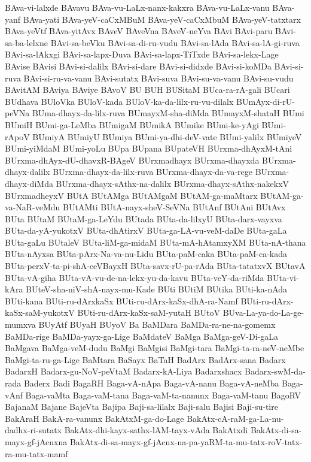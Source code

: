 {BAva-vi-lalxde
BAvavu
BAva-vu-LaLx-nanx-kakxra
BAva-vu-LaLx-vanu
BAva-yanf
BAva-yati
BAva-yeV-caCxMBuM
BAva-yeV-caCxMbuM
BAva-yeV-tatxtarx
BAva-yeVtf
BAva-yitAvx
BAveV
BAveVna
BAveV-neYva
BAvi
BAvi-paru
BAvi-sa-ba-lelxne
BAvi-sa-beVku
BAvi-sa-di-ru-vudu
BAvi-sa-lAda
BAvi-sa-lA-gi-ruva
BAvi-sa-lAkxgi
BAvi-sa-lapx-Duva
BAvi-sa-lapx-TiTxde
BAvi-sa-lekx-Lage
BAvise
BAvisi
BAvi-si-dalilx
BAvi-si-dare
BAvi-si-didxde
BAvi-si-koMDa
BAvi-si-ruva
BAvi-si-ru-va-vanu
BAvi-sutatx
BAvi-suva
BAvi-su-va-vanu
BAvi-su-vudu
BAvitAM
BAviya
BAviye
BAvoV
BU
BUH
BUSitaM
BUca-ra-rA-gali
BUcari
BUdhava
BUloVka
BUloV-kada
BUloV-ka-da-lilx-ru-vu-dilalx
BUmAyx-di-rU-peVNa
BUma-dhayx-da-lilx-ruva
BUmayxM-sha-diMda
BUmayxM-shataH
BUmi
BUmiH
BUmi-ga-LeMba
BUmigaM
BUmikA
BUmike
BUmi-ke-yAgi
BUmi-rApoV
BUmiyA
BUmiyU
BUmiya
BUmi-ya-dhi-deV-vate
BUmi-yalilx
BUmiyeV
BUmi-yiMdaM
BUmi-yoLu
BUpa
BUpana
BUpateVH
BUrxma-dhAyxM-tAni
BUrxma-dhAyx-dU-dhavxR-BAgeV
BUrxmadhayx
BUrxma-dhayxda
BUrxma-dhayx-dalilx
BUrxma-dhayx-da-lilx-ruva
BUrxma-dhayx-da-va-rege
BUrxma-dhayx-diMda
BUrxma-dhayx-sAthx-na-dalilx
BUrxma-dhayx-sAthx-nakekxV
BUrxmadheyxV
BUtA
BUtAMga
BUtAMgaM
BUtAM-ga-maMtarx
BUtAM-ga-va-NaR-veMdu
BUtAMti
BUtA-nayx-sheV-SeVNa
BUtAnf
BUtAni
BUtAvx
BUta
BUtaM
BUtaM-ga-LeYdu
BUtada
BUta-da-lilxyU
BUta-darx-vayxva
BUta-da-yA-yukotxV
BUta-dhAtirxV
BUta-ga-LA-vu-veM-daDe
BUta-gaLa
BUta-gaLu
BUtaleV
BUta-liM-ga-midaM
BUta-mA-hAtamxyXM
BUta-nA-thana
BUta-nAyxsa
BUta-pArx-Na-va-nu-Lidu
BUta-paM-caka
BUta-paM-ca-kada
BUta-perxV-ta-pi-shA-ceVBayxH
BUta-savx-rU-pa-rAda
BUta-tatatxvX
BUtavA
BUta-vA-giha
BUta-vA-vu-de-na-lekx-yu-da-kavu
BUta-veY-da-riMda
BUta-vi-kAra
BUteV-sha-niV-shA-nayx-mu-Kade
BUti
BUtiM
BUtika
BUti-ka-nAda
BUti-kana
BUti-ru-dArxkaSx
BUti-ru-dArx-kaSx-dhA-ra-Namf
BUti-ru-dArx-kaSx-saM-yukotxV
BUti-ru-dArx-kaSx-saM-yutaH
BUtoV
BUva-La-ya-do-La-ge-mumxva
BUyAtf
BUyaH
BUyoV
Ba
BaMDara
BaMDa-ra-ne-na-gomemx
BaMDa-rige
BaMDa-yayx-ga-Lige
BaMdateV
BaMga
BaMga-geV-Di-gaLa
BaMgava
BaMga-veM-dudu
BaMgi
BaMgisi
BaMgi-tara
BaMgi-ta-ra-neV-neMbe
BaMgi-ta-ru-ga-Lige
BaMtara
BaSayx
BaTaH
BadArx
BadArx-sana
Badarx
BadarxH
Badarx-gu-NoV-peVtaM
Badarx-kA-Liya
Badarxshacx
Badarx-swM-da-rada
Baderx
Badi
BagaRH
Baga-vA-nApa
Baga-vA-nanu
Baga-vA-neMba
Baga-vAnf
Baga-vaMta
Baga-vaM-tana
Baga-vaM-ta-nanunx
Baga-vaM-tanu
BagoRV
BajanaM
Bajane
BajeVta
Bajipa
Baji-sa-lilalx
Baji-salu
Bajisi
Baji-su-tire
BakAraH
BakA-ra-vanunx
BakAtxM-ga-do-Lage
BakAtx-cA-raM-ga-La-nu-dadhx-ri-sutatx
BakAtx-dhi-kayx-sathx-lAM-tayx-vAda
BakAtxdi
BakAtx-di-sa-mayx-gf-jAcnxna
BakAtx-di-sa-mayx-gf-jAcnx-na-pa-yaRM-ta-mu-tatx-roV-tatx-ra-mu-tatx-mamf
}
